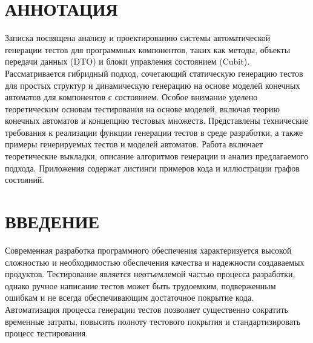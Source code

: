 \documentclass[14pt, russian]{scrartcl}
\newcommand{\anonsection}[1]{\cleardoublepage
\phantomsection
\addcontentsline{toc}{section}{\protect\numberline{}#1}
\section*{#1}\vspace*{2.5ex} %
}
\begin{document}

\setlength{\tabcolsep}{3pt}
\newpage
\setcounter{page}{2}

\section*{АННОТАЦИЯ}

Записка посвящена анализу и проектированию системы автоматической генерации тестов для программных компонентов, таких как методы, объекты передачи данных (DTO) и блоки управления состоянием (Cubit). Рассматривается гибридный подход, сочетающий статическую генерацию тестов для простых структур и динамическую генерацию на основе моделей конечных автоматов для компонентов с состоянием. Особое внимание уделено теоретическим основам тестирования на основе моделей, включая теорию конечных автоматов и концепцию тестовых множеств. Представлены технические требования к реализации функции генерации тестов в среде разработки, а также примеры генерируемых тестов и моделей автоматов. Работа включает теоретические выкладки, описание алгоритмов генерации и анализ предлагаемого подхода. Приложения содержат листинги примеров кода и иллюстрации графов состояний.


\newpage
\renewcommand\contentsname{\hfill{\normalfont{СОДЕРЖАНИЕ}}\hfill}
\tableofcontents
\newpage
\anonsection{ВВЕДЕНИЕ}

Современная разработка программного обеспечения характеризуется высокой сложностью и необходимостью обеспечения качества и надежности создаваемых продуктов. Тестирование является неотъемлемой частью процесса разработки, однако ручное написание тестов может быть трудоемким, подверженным ошибкам и не всегда обеспечивающим достаточное покрытие кода. Автоматизация процесса генерации тестов позволяет существенно сократить временные затраты, повысить полноту тестового покрытия и стандартизировать процесс тестирования.
\end{document}
